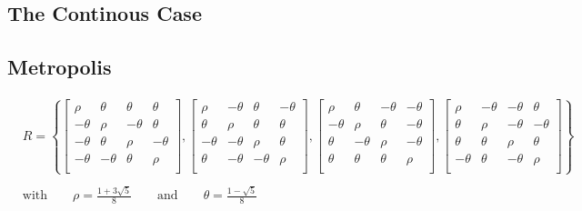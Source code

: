 

\subsection{The Continous Case}



\subsection{Metropolis}


\begin{align*}
 &R = \left\{
 \begin{bmatrix}
  \rho    & \theta  & \theta  & \theta  \\
  -\theta & \rho    & -\theta & \theta  \\
  -\theta & \theta  & \rho    & -\theta \\
  -\theta & -\theta & \theta  & \rho    \\
 \end{bmatrix},
 \begin{bmatrix}
  \rho    & -\theta & \theta & -\theta \\
  \theta  & \rho    & \theta & \theta  \\
  -\theta & -\theta  & \rho   & \theta  \\
  \theta  & -\theta & -\theta & \rho    \\
 \end{bmatrix},
 \begin{bmatrix}
  \rho    & \theta & -\theta & -\theta \\
  -\theta  & \rho    & \theta & -\theta  \\
  \theta & -\theta  & \rho   & -\theta  \\
  \theta  & \theta & \theta & \rho    \\
 \end{bmatrix},
 \begin{bmatrix}
  \rho    & -\theta & -\theta & \theta \\
  \theta  & \rho    & -\theta & -\theta  \\
  \theta & \theta  & \rho   & \theta  \\
  -\theta  & \theta & -\theta & \rho    \\
 \end{bmatrix}
 \right\}\\\\
 &\textrm{with} \qquad \rho = \frac{1 + 3\sqrt{5}}{8} \qquad \textrm{and} \qquad \theta = \frac{1-\sqrt{5}}{8}
\end{align*}




